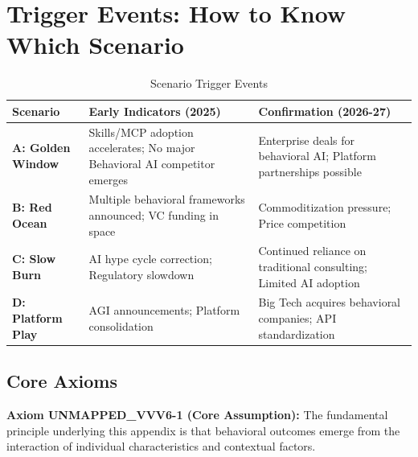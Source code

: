 \section{Trigger Events: How to Know Which Scenario}
\label{sec:vvv-triggers}

\begin{table}[htbp]
\centering
\caption{Scenario Trigger Events}
\label{tab:vvv-triggers}
\renewcommand{\arraystretch}{1.3}
\begin{tabular}{@{}lp{5cm}p{5cm}@{}}
\toprule
\textbf{Scenario} & \textbf{Early Indicators (2025)} & \textbf{Confirmation (2026-27)} \\
\midrule
\textbf{A: Golden Window} &
Skills/MCP adoption accelerates; No major Behavioral AI competitor emerges &
Enterprise deals for behavioral AI; Platform partnerships possible \\
\midrule
\textbf{B: Red Ocean} &
Multiple behavioral frameworks announced; VC funding in space &
Commoditization pressure; Price competition \\
\midrule
\textbf{C: Slow Burn} &
AI hype cycle correction; Regulatory slowdown &
Continued reliance on traditional consulting; Limited AI adoption \\
\midrule
\textbf{D: Platform Play} &
AGI announcements; Platform consolidation &
Big Tech acquires behavioral companies; API standardization \\
\bottomrule
\end{tabular}
\end{table}




\subsection{Core Axioms}
\label{sec:vvv6-axioms}

\begin{tcolorbox}[colback=yellow!5!white,colframe=yellow!75!black,title=Axiom UNMAPPED_VVV6-1: Fundamental Principle]
\textbf{Axiom UNMAPPED_VVV6-1 (Core Assumption):}
The fundamental principle underlying this appendix is that behavioral outcomes
emerge from the interaction of individual characteristics and contextual factors.
\end{tcolorbox}

